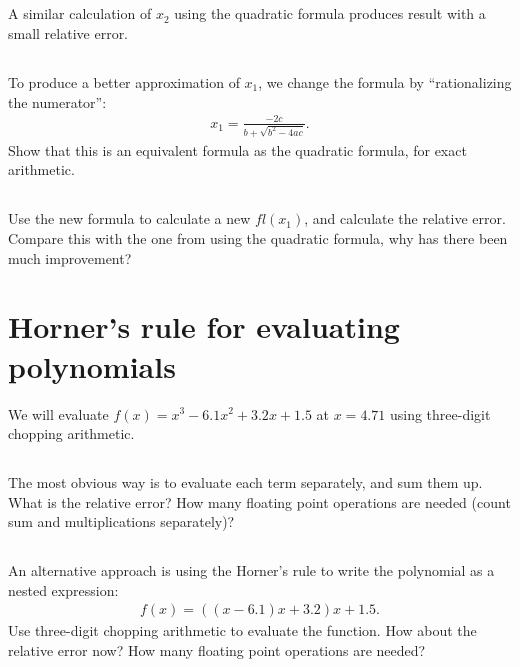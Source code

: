 \documentclass[11pt,letterpaper]{article}
\begin{document}
\subsection{}
A similar calculation of $x_2$ using the quadratic formula produces result with a small relative error.

\subsection{}
To produce a better approximation of $x_1$, we change the formula by ``rationalizing the numerator'':
\begin{align*}
    x_1 = \frac{-2c}{b+\sqrt{b^2-4ac}}.
\end{align*}
Show that this is an equivalent formula as the quadratic formula, for exact arithmetic.

\subsection{}
Use the new formula to calculate a new $fl(x_1)$, and calculate the relative error. Compare this with the one from using the quadratic formula, why has there been much improvement?

\section{Horner's rule for evaluating polynomials}
We will evaluate $f(x) = x^3-6.1x^2+3.2x+1.5$ at $x=4.71$ using three-digit chopping arithmetic. 

\subsection{}
The most obvious way is to evaluate each term separately, and sum them up. What is the relative error? How many floating point operations are needed (count sum and multiplications separately)?

\subsection{}
An alternative approach is using the Horner's rule to write the polynomial as a nested expression:
\begin{align*}
    f(x) = ((x-6.1)x+3.2)x+1.5.
\end{align*}
Use three-digit chopping arithmetic to evaluate the function. How about the relative error now? How many floating point operations are needed?




\vfill


\end{document}

